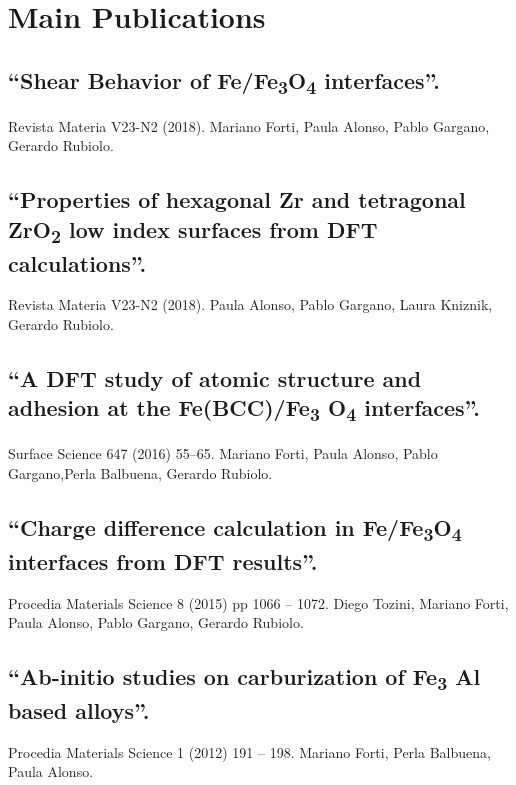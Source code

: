 \section{Main Publications}

\subsection{“Shear Behavior of Fe/Fe\textsubscript{3}O\textsubscript{4} interfaces”. } Revista Materia V23-N2 (2018). Mariano Forti, Paula Alonso, Pablo Gargano, Gerardo Rubiolo. 

\subsection{“Properties of hexagonal Zr and tetragonal ZrO\textsubscript{2} low index surfaces from DFT calculations”. } Revista Materia V23-N2 (2018). Paula Alonso, Pablo Gargano, Laura Kniznik, Gerardo Rubiolo. 

\subsection{“A DFT study of atomic structure and adhesion at the Fe(BCC)/Fe\textsubscript{3} O\textsubscript{4} interfaces”. } Surface Science 647 (2016) 55–65. Mariano Forti, Paula Alonso, Pablo Gargano,Perla Balbuena, Gerardo Rubiolo.

\subsection{“Charge difference calculation in Fe/Fe\textsubscript{3}O\textsubscript{4} interfaces from DFT results”. } Procedia Materials Science 8 (2015) pp 1066 – 1072. Diego Tozini, Mariano Forti, Paula Alonso, Pablo Gargano, Gerardo Rubiolo.

\subsection{“Ab-initio studies on carburization of Fe\textsubscript{3} Al based alloys”. } Procedia Materials Science 1 (2012) 191 – 198. Mariano Forti, Perla Balbuena, Paula Alonso.

